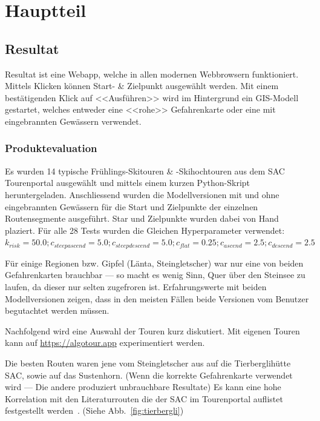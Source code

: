 \section{Hauptteil}
\subsection{Resultat}

Resultat ist eine Webapp, welche in allen modernen Webbrowsern funktioniert. Mittels Klicken können Start- \& Zielpunkt ausgewählt werden. Mit einem bestätigenden Klick auf <<Ausführen>> wird im Hintergrund ein GIS-Modell gestartet, welches entweder eine <<rohe>> Gefahrenkarte oder eine mit eingebrannten Gewässern verwendet.

\subsubsection{Produktevaluation}

Es wurden 14 typische Frühlings-Skitouren \& -Skihochtouren aus dem SAC Tourenportal ausgewählt und mittels einem kurzen Python-Skript heruntergeladen. Anschliessend wurden die Modellversionen mit und ohne eingebrannten Gewässern für die Start und Zielpunkte der einzelnen Routensegmente ausgeführt. Star und Zielpunkte wurden dabei von Hand plaziert. Für alle 28 Tests wurden die Gleichen Hyperparameter verwendet: $k_{risk}={50.0}; c_{steepascend}={5.0}; c_{steepdescend}={5.0}; c_{flat}={0.25}; c_{ascend}={2.5}; c_{descend}={2.5}$

Für einige Regionen bzw. Gipfel (Länta, Steingletscher) war nur eine von beiden Gefahrenkarten brauchbar --- so macht es wenig Sinn, Quer über den Steinsee zu laufen, da dieser nur selten zugefroren ist. Erfahrungswerte mit beiden Modellversionen zeigen, dass in den meisten Fällen beide Versionen vom Benutzer begutachtet werden müssen.


Nachfolgend wird eine Auswahl der Touren kurz diskutiert. Mit eigenen Touren kann auf \url{https://algotour.app} experimentiert werden.

Die besten Routen waren jene vom Steingletscher aus auf die Tierberglihütte SAC, sowie auf das Sustenhorn. (Wenn die korrekte Gefahrenkarte verwendet wird --- Die andere produziert unbrauchbare Resultate) Es kann eine hohe Korrelation mit den Literaturrouten die der SAC im Tourenportal auflistet festgestellt werden~\cite{mmzentralch}. (Siehe Abb.\ \ref{fig:tierbergli})

